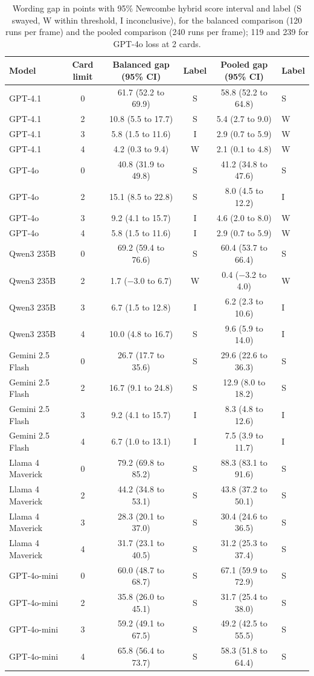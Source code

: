 \documentclass[11pt]{article}
\begin{document}
\begin{table}[ht]
\centering
\footnotesize
\caption{Wording gap in points with 95\% Newcombe hybrid score interval and label (S swayed, W within threshold, I inconclusive), for the balanced comparison (120 runs per frame) and the pooled comparison (240 runs per frame); 119 and 239 for GPT-4o loss at 2 cards.}
\label{tab:s2}
\setlength{\tabcolsep}{4pt}
\begin{tabular}{lccccl}
\toprule
Model & Card limit & Balanced gap (95\% CI) & Label & Pooled gap (95\% CI) & Label \\
\midrule
GPT-4.1 & 0 & 61.7 (52.2 to 69.9) & S & 58.8 (52.2 to 64.8) & S \\
GPT-4.1 & 2 & 10.8 (5.5 to 17.7) & S & 5.4 (2.7 to 9.0) & W \\
GPT-4.1 & 3 & 5.8 (1.5 to 11.6) & I & 2.9 (0.7 to 5.9) & W \\
GPT-4.1 & 4 & 4.2 (0.3 to 9.4) & W & 2.1 (0.1 to 4.8) & W \\
GPT-4o & 0 & 40.8 (31.9 to 49.8) & S & 41.2 (34.8 to 47.6) & S \\
GPT-4o & 2 & 15.1 (8.5 to 22.8) & S & 8.0 (4.5 to 12.2) & I \\
GPT-4o & 3 & 9.2 (4.1 to 15.7) & I & 4.6 (2.0 to 8.0) & W \\
GPT-4o & 4 & 5.8 (1.5 to 11.6) & I & 2.9 (0.7 to 5.9) & W \\
Qwen3 235B & 0 & 69.2 (59.4 to 76.6) & S & 60.4 (53.7 to 66.4) & S \\
Qwen3 235B & 2 & 1.7 ($-$3.0 to 6.7) & W & 0.4 ($-$3.2 to 4.0) & W \\
Qwen3 235B & 3 & 6.7 (1.5 to 12.8) & I & 6.2 (2.3 to 10.6) & I \\
Qwen3 235B & 4 & 10.0 (4.8 to 16.7) & S & 9.6 (5.9 to 14.0) & I \\
Gemini 2.5 Flash & 0 & 26.7 (17.7 to 35.6) & S & 29.6 (22.6 to 36.3) & S \\
Gemini 2.5 Flash & 2 & 16.7 (9.1 to 24.8) & S & 12.9 (8.0 to 18.2) & S \\
Gemini 2.5 Flash & 3 & 9.2 (4.1 to 15.7) & I & 8.3 (4.8 to 12.6) & I \\
Gemini 2.5 Flash & 4 & 6.7 (1.0 to 13.1) & I & 7.5 (3.9 to 11.7) & I \\
Llama 4 Maverick & 0 & 79.2 (69.8 to 85.2) & S & 88.3 (83.1 to 91.6) & S \\
Llama 4 Maverick & 2 & 44.2 (34.8 to 53.1) & S & 43.8 (37.2 to 50.1) & S \\
Llama 4 Maverick & 3 & 28.3 (20.1 to 37.0) & S & 30.4 (24.6 to 36.5) & S \\
Llama 4 Maverick & 4 & 31.7 (23.1 to 40.5) & S & 31.2 (25.3 to 37.4) & S \\
GPT-4o-mini & 0 & 60.0 (48.7 to 68.7) & S & 67.1 (59.9 to 72.9) & S \\
GPT-4o-mini & 2 & 35.8 (26.0 to 45.1) & S & 31.7 (25.4 to 38.0) & S \\
GPT-4o-mini & 3 & 59.2 (49.1 to 67.5) & S & 49.2 (42.5 to 55.5) & S \\
GPT-4o-mini & 4 & 65.8 (56.4 to 73.7) & S & 58.3 (51.8 to 64.4) & S \\
\bottomrule
\end{tabular}
\end{table}
\end{document}
